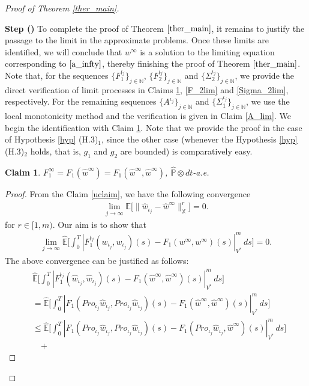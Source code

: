 \documentclass[english,a4paper,11pt]{amsart}
\theoremstyle{plain}
\newtheorem{claim}[theorem]{Claim}
\theoremstyle{definition}
\theoremstyle{remark}
\numberwithin{equation}{section}
\newcounter{lil1}
\newenvironment{step}
{\begin{list} { \bf Step (\Roman{lil1})}
		{ \usecounter{lil1}
			\setlength{\leftmargin}{0.0cm}
			\setlength{\topsep}{0.2cm}
			\setlength{\itemsep}{0.0cm}
			\setlength{\parsep}{0.1cm}
			\setlength{\itemindent}{0.8cm}
			\setlength{\parskip}{0.0cm}}}
	{\end{list}}
\newcounter{lil33}
\newcounter{lil1q}
\newcommand{\wh}{\widehat}
\newcommand{\PP}{{\mathbb{P}}}
\newcommand{\EE}{ \mathbb{E} }
\newcommand{\N}{\mathbb{N}}
\newcommand{\X}{\mathbb{X}}
\newcommand{\Pro}{Pro}
\begin{document}
\begin{proof}[Proof of Theorem \ref{ther_main}]
\begin{step}
To complete the proof of Theorem $\ref{ther_main}$, it remains to justify the passage to the limit in the approximate problems. Once these limits are identified, we will conclude that $w^\infty$ is a solution to the limiting equation corresponding to $\eqref{a_infty}$, thereby finishing the proof of Theorem $\ref{ther_main}$. Note that, for the sequences $\{F_1^{\iota_j}\}_{j\in\N}$, $\{F_2^{\iota_j}\}_{j\in\N}$ and $\{\Sigma_2^{\iota_j}\}_{j\in\N}$, we provide the direct verification of limit processes in Claims \ref{F_1lim}, \ref{F_2lim} and \ref{Sigma_2lim}, respectively. For the remaining sequences $\{A^{\iota_j}\}_{j\in\N}$ and $\{\Sigma_1^{\iota_j}\}_{j\in\N}$, we use the local monotonicity method and the verification is given in Claim \ref{A_lim}. 
We begin the identification with Claim \ref{F_1lim}. Note that we provide the proof in the case of Hypothesis \ref{hyp} (H.3)$_1$, since the other case (whenever the Hypothesis \ref{hyp} (H.3)$_2$ holds, that is, $g_1$ and $g_2$ are bounded)  is comparatively easy. 
%
\begin{claim}\label{F_1lim}
		$F_1^\infty=F_1(\wh{w}^\infty)=F_1(\wh{w}^\infty,\wh{w}^\infty)$, $\wh{\PP}\otimes dt$-a.e.
\end{claim}
\begin{proof}
	From the Claim \ref{uclaim}, we have the following convergence 
	\begin{align*}	
		\lim_{j\to\infty}{\EE}\Big[\big\|{\wh{w}}_{\iota_j}-{\wh{w}}^\infty\big\|_\X^r\Big]=0.
	\end{align*}for $r\in[1,m)$.
	Our aim is to show that 
	\begin{align*}
		\lim_{j\to\infty}\wh{\EE}\bigg[\int_0^T  | F_1^{\iota_j}(w_{\iota_j},w_{\iota_j})(s)-F_1(w^\infty,w^\infty)(s) | _{V^\ast}^m\,ds\bigg]=0.
			\end{align*}The above convergence can be justified as follows:
			\begin{align*}
			&	\wh{\EE}\bigg[\int_0^T  | F_1^{\iota_j}(\wh{w}_{\iota_j},\wh{w}_{\iota_j})(s)-F_1(\wh{w}^\infty,\wh{w}^\infty)(s) | _{V^\ast}^m\,ds\bigg]\\&
			=
			\wh{\EE}\bigg[\int_0^T  | F_1(\Pro_{\iota_j} \wh{w}_{\iota_j},\Pro_{\iota_j} \wh{w}_{\iota_j})(s)-F_1(\wh{w}^\infty,\wh{w}^\infty)(s) | _{V^\ast}^m\,ds\bigg]
			\\&\leq 
			\wh{\EE}\bigg[\int_0^T  | F_1(\Pro_{\iota_j} \wh{w}_{\iota_j},\Pro_{\iota_j} \wh{w}_{\iota_j})(s)-F_1(\Pro_{\iota_j}\wh{w}_{\iota_j} ,\wh{w}^\infty)(s) | _{V^\ast}^m\,ds\bigg]
			\\&\quad +

\end{align*}
\end{proof}
\end{step}
\end{proof}
\end{document}
